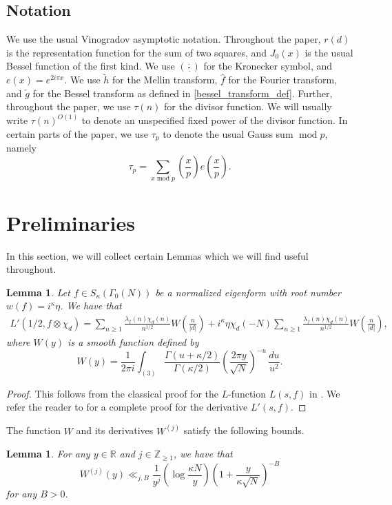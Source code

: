 \documentclass[12pt]{amsart}
\def\Z{\mathbb{Z}}
\newtheorem{lemma}[theorem]{Lemma}
\def\Z{\mathbb Z}
\def\R{\mathbb R}
\def\Z{\mathbb Z}
\def\R{\mathbb R}
\def\mod{\operatorname{mod}}
\def\log{\operatorname{log}}
\begin{document}
\subsection{Notation} 
We use the usual Vinogradov asymptotic notation. Throughout the paper, $r(d)$ is the representation function for the sum of two squares, and $J_0(x)$ is the usual Bessel function of the first kind. We use $\left( \frac{\cdot}{\cdot} \right)$ for the Kronecker symbol, and $e(x) = e^{2i\pi x}$. We use $\tilde{h}$ for the Mellin transform, $\hat{f}$ for the Fourier transform, and $\check{g}$ for the Bessel transform as defined in \eqref{bessel_transform_def}. Further, throughout the paper, we use $\tau(n)$ for the divisor function. We will usually write $\tau(n)^{O(1)}$ to denote an unspecified fixed power of the divisor function. In certain parts of the paper, we use $\tau_p$ to denote the usual Gauss sum $\mod p$, namely 
$$ \tau_p =\sum_{x \mod p}\left( \frac{x}{p} \right) e\left( \frac{x}{p} \right) .$$



\section{Preliminaries}
In this section, we will collect certain Lemmas which we will find useful throughout.
\begin{lemma}\label{AFE}
    Let $f\in S_{\kappa}(\Gamma_0(N))$ be a normalized eigenform with root number $w(f)=i^{\kappa}\eta$. We have that 
    \begin{align*}
    L'(1/2,f\otimes \chi_d)=\sum_{n\geq 1}\frac{\lambda_f(n)\chi_d(n)}{n^{1/2}}W\left(\frac{n}{|d|}\right)+i^{\kappa}\eta\chi_d(-N)\sum_{n\geq 1}\frac{\lambda_f(n)\chi_d(n)}{n^{1/2}}W\left(\frac{n}{|d|}\right),
    \end{align*}
    where $W(y)$ is a smooth function defined by
    \[W(y)=\frac{1}{2\pi i}\int_{(3)}\frac{\Gamma(u+\kappa/2)}{\Gamma(\kappa/2)}\left(\frac{2\pi y}{\sqrt{N}}\right)^{-u}\,\frac{du}{u^2}.\]
\end{lemma}
\begin{proof}
    This follows from the classical proof for the $L$-function $L(s,f)$ in \cite[Theorem 5.3]{Iwk}. We refer the reader to \cite[Lemma 1]{Petrow} for a complete proof for the derivative $L'(s,f)$.
\end{proof}
 The function $W$ and its derivatives $W^{(j)}$ satisfy the following bounds.
 
\begin{lemma}\label{W_bound}
For any $y\in \R$ and $j\in\Z_{\geq 1}$, we have that
  \[W^{(j)}(y)\ll_{j,B} \frac{1}{y^j}\left(\log\frac{\kappa N}{y}\right)\left(1+\frac{y}{\kappa \sqrt{N}}\right)^{-B}\]
  for any $B>0$.
\end{lemma}
\end{document}
